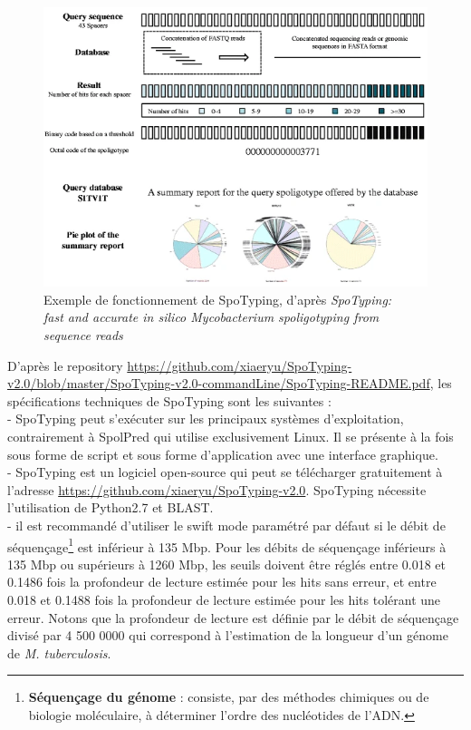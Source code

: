 \documentclass[twoside,a4paper,11pt,frenchb,openany]{report}
\begin{document}
\begin{figure}[h!]
\centering
\includegraphics[scale=0.65]{spotyping.png}
\caption{Exemple de fonctionnement de SpoTyping, d'après \textit{SpoTyping:\\ fast and accurate in silico Mycobacterium spoligotyping from sequence reads}}
\end{figure}

D'après le repository \url{https://github.com/xiaeryu/SpoTyping-v2.0/blob/master/SpoTyping-v2.0-commandLine/SpoTyping-README.pdf}, les spécifications techniques de SpoTyping sont les suivantes :\\
- SpoTyping peut s'exécuter sur les principaux systèmes d'exploitation, contrairement à SpolPred qui utilise exclusivement Linux. Il se présente à la fois sous forme de script et sous forme d'application avec une interface graphique.\\
- SpoTyping est un logiciel open-source qui peut se télécharger gratuitement à l'adresse \url{https://github.com/xiaeryu/SpoTyping-v2.0}. SpoTyping nécessite l'utilisation de Python2.7 et BLAST.\\
- il est recommandé d'utiliser le swift mode paramétré par défaut si le débit de séquençage\footnote{\textbf{Séquençage du génome} : consiste, par des méthodes chimiques ou de biologie moléculaire, à déterminer l'ordre des nucléotides de l'ADN.} est inférieur à 135 Mbp. Pour les débits de séquençage inférieurs à 135 Mbp ou supérieurs à 1260 Mbp, les seuils doivent être réglés entre 0.018 et 0.1486 fois la profondeur de lecture estimée pour les hits sans erreur, et entre 0.018 et 0.1488 fois la profondeur de lecture estimée pour les hits tolérant une erreur. Notons que la profondeur de lecture est définie par le débit de séquençage divisé par 4 500 0000 qui correspond à l'estimation de la longueur d'un génome de \textit{M. tuberculosis}.
\end{document}
